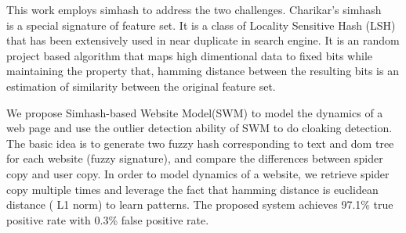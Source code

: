 
This work employs simhash to address the two challenges.
Charikar's simhash ~\cite{charikar2002similarity} is a special signature of feature set. 
It is a class of Locality Sensitive Hash (LSH) that has been extensively used in
near duplicate in search engine.
It is an random project based algorithm that maps high dimentional data to fixed bits while
maintaining the property that, hamming distance between the resulting bits is an
estimation of similarity between the original feature set.

%
We propose Simhash-based Website Model(SWM) to model the dynamics of a
web page and use the outlier detection ability of SWM to do cloaking detection.
The basic idea is to generate two fuzzy hash corresponding to text and dom tree
for each website (fuzzy signature), and compare the differences between spider copy and user copy.
In order to model dynamics of a website, we retrieve spider copy multiple
times and leverage the fact that hamming distance is euclidean distance (
L1 norm) to learn patterns.
The proposed system achieves 97.1\% true positive rate with
0.3\% false positive rate.

